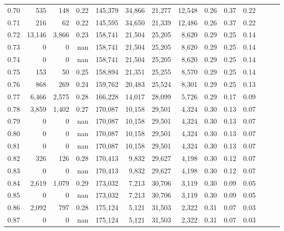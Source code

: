 \begin{tabular}{rrrrrrrrrrrrrr}
0.70 &     535 &    148 &  0.22 &  145,379 &   34,866 &  21,277 &  12,548 &  0.26 &  0.37 &      0.22 \\
0.71 &     216 &     62 &  0.22 &  145,595 &   34,650 &  21,339 &  12,486 &  0.26 &  0.37 &      0.22 \\
0.72 &  13,146 &  3,866 &  0.23 &  158,741 &   21,504 &  25,205 &   8,620 &  0.29 &  0.25 &      0.14 \\
0.73 &       0 &      0 &   nan &  158,741 &   21,504 &  25,205 &   8,620 &  0.29 &  0.25 &      0.14 \\
0.74 &       0 &      0 &   nan &  158,741 &   21,504 &  25,205 &   8,620 &  0.29 &  0.25 &      0.14 \\
0.75 &     153 &     50 &  0.25 &  158,894 &   21,351 &  25,255 &   8,570 &  0.29 &  0.25 &      0.14 \\
0.76 &     868 &    269 &  0.24 &  159,762 &   20,483 &  25,524 &   8,301 &  0.29 &  0.25 &      0.13 \\
0.77 &   6,466 &  2,575 &  0.28 &  166,228 &   14,017 &  28,099 &   5,726 &  0.29 &  0.17 &      0.09 \\
0.78 &   3,859 &  1,402 &  0.27 &  170,087 &   10,158 &  29,501 &   4,324 &  0.30 &  0.13 &      0.07 \\
0.79 &       0 &      0 &   nan &  170,087 &   10,158 &  29,501 &   4,324 &  0.30 &  0.13 &      0.07 \\
0.80 &       0 &      0 &   nan &  170,087 &   10,158 &  29,501 &   4,324 &  0.30 &  0.13 &      0.07 \\
0.81 &       0 &      0 &   nan &  170,087 &   10,158 &  29,501 &   4,324 &  0.30 &  0.13 &      0.07 \\
0.82 &     326 &    126 &  0.28 &  170,413 &    9,832 &  29,627 &   4,198 &  0.30 &  0.12 &      0.07 \\
0.83 &       0 &      0 &   nan &  170,413 &    9,832 &  29,627 &   4,198 &  0.30 &  0.12 &      0.07 \\
0.84 &   2,619 &  1,079 &  0.29 &  173,032 &    7,213 &  30,706 &   3,119 &  0.30 &  0.09 &      0.05 \\
0.85 &       0 &      0 &   nan &  173,032 &    7,213 &  30,706 &   3,119 &  0.30 &  0.09 &      0.05 \\
0.86 &   2,092 &    797 &  0.28 &  175,124 &    5,121 &  31,503 &   2,322 &  0.31 &  0.07 &      0.03 \\
0.87 &       0 &      0 &   nan &  175,124 &    5,121 &  31,503 &   2,322 &  0.31 &  0.07 &      0.03 \\

\end{tabular}
